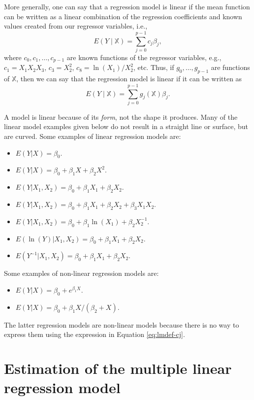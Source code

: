 \documentclass[
]{book}
\providecommand{\tightlist}{%
  \setlength{\itemsep}{0pt}\setlength{\parskip}{0pt}}
\theoremstyle{definition}
\theoremstyle{definition}
\theoremstyle{definition}
\theoremstyle{definition}
\theoremstyle{remark}
\begin{document}
More generally, one can say that a regression model is linear if the mean function can be written as a linear combination of the regression coefficients and known values created from our regressor variables, i.e.,
\[
E(Y \mid \mathbb{X}) = \sum_{j=0}^{p-1} c_j \beta_j, \label{eq:lmdef-cj}
\]
where \(c_0, c_1, \ldots, c_{p-1}\) are known functions of
the regressor variables, e.g., \(c_1 = X_1 X_2 X_3\), \(c_3 = X_2^2\),
\(c_8 = \ln(X_1)/X_2^2\), etc. Thus, if \(g_0,\ldots,g_{p-1}\) are functions of \(\mathbb{X}\), then we can say that the regression model is linear if
it can be written as
\[
E(Y\mid \mathbb{X}) = \sum_{j=0}^{p-1} g_j(\mathbb{X})\beta_j.
\]

A model is linear because of its \emph{form}, not the shape it produces. Many of the linear model examples given below do not result in a straight line or surface, but are curved. Some examples of linear regression models are:

\begin{itemize}
\tightlist
\item
  \(E(Y|X) = \beta_0\).
\item
  \(E(Y|X) = \beta_0 + \beta_1 X + \beta_2 X^2\).
\item
  \(E(Y|X_1, X_2) = \beta_0 + \beta_1 X_1 + \beta_2 X_2\).
\item
  \(E(Y|X_1, X_2) = \beta_0 + \beta_1 X_1 + \beta_2 X_2 + \beta_3 X_1 X_2\).
\item
  \(E(Y|X_1, X_2) = \beta_0 + \beta_1 \ln(X_1) + \beta_2 X_2^{-1}\).
\item
  \(E(\ln(Y)|X_1, X_2) = \beta_0 + \beta_1 X_1 + \beta_2 X_2\).
\item
  \(E(Y^{-1}|X_1, X_2) = \beta_0 + \beta_1 X_1 + \beta_2 X_2\).
\end{itemize}

Some examples of non-linear regression models are:

\begin{itemize}
\tightlist
\item
  \(E(Y|X) = \beta_0 + e^{\beta_1 X}\).
\item
  \(E(Y|X) = \beta_0 + \beta_1 X/(\beta_2 + X)\).
\end{itemize}

The latter regression models are non-linear models because there is no way to express them using the expression in Equation \eqref{eq:lmdef-cj}.

\hypertarget{estimation-of-the-multiple-linear-regression-model}{%
\section{Estimation of the multiple linear regression model}\label{estimation-of-the-multiple-linear-regression-model}}
\end{document}
